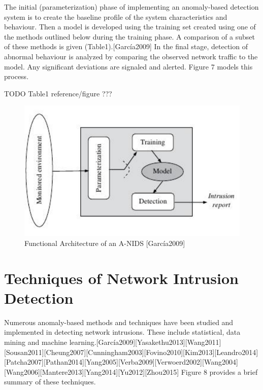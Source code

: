 \documentclass[12pt,]{article}
\begin{document}
The initial (parameterization) phase of implementing an anomaly-based
detection system is to create the baseline profile of the system
characteristics and behaviour. Then a model is developed using the
training set created using one of the methods outlined below during the
training phase. A comparison of a subset of these methods is given
(Table1).{[}García2009{]} In the final stage, detection of abnormal
behaviour is analyzed by comparing the observed network traffic to the
model. Any significant deviations are signaled and alerted. Figure 7
models this process.

TODO Table1 reference/figure ???

\begin{figure}

{\centering \includegraphics{thesis_files/figure-latex/unnamed-chunk-10-1} 

}

\caption{Functional Architecture of an A-NIDS [García2009]}\label{fig:unnamed-chunk-10}
\end{figure}

\pagebreak

\section{Techniques of Network Intrusion
Detection}\label{techniques-of-network-intrusion-detection}

Numerous anomaly-based methods and techniques have been studied and
implemented in detecting network intrusions. These include statistical,
data mining and machine
learning.{[}García2009{]}{[}Yasakethu2013{]}{[}Wang2011{]}{[}Sousan2011{]}{[}Cheung2007{]}{[}Cunningham2003{]}{[}Fovino2010{]}{[}Kim2013{]}{[}Leandro2014{]}{[}Patcha2007{]}{[}Pathan2014{]}{[}Yang2005{]}{[}Verba2009{]}{[}Verwoerd2002{]}{[}Wang2004{]}{[}Wang2006{]}{[}Mantere2013{]}{[}Yang2014{]}{[}Yu2012{]}{[}Zhou2015{]}
Figure 8 provides a brief summary of these techniques.
\end{document}
